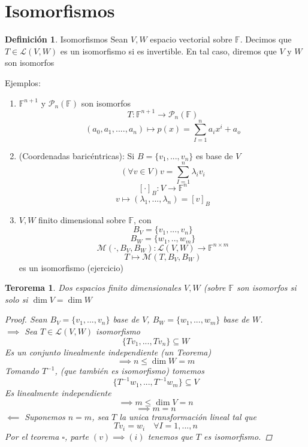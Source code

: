 \documentclass[11pt]{book}
\newtheorem{thm}{Terorema}[section]
\theoremstyle{definition}
\newtheorem{defn}{Definición}[section]
\begin{document}
\section{Isomorfismos}
\begin{defn}{Isomorfismos}
Sean $V,W$ espacio vectorial sobre $\mathbb{F}$. Decimos que $T\in\mathcal{L}(V,W)$ es un isomorfismo si es invertible. En tal caso, diremos que $V$ y $W$ son isomorfos
\end{defn}
Ejemplos:
\begin{enumerate}
	\item $\mathbb{F}^{n+1}$ y $\mathcal{P}_n(\mathbb{F})$ son isomorfos
	\[T:\mathbb{F}^{n+1}\rightarrow \mathcal{P}_n(\mathbb{F})\]
	\[(a_0,a_1,....,a_n)\mapsto p(x)=\sum^n_{I=1}a_ix^i+a_o\]
	
	\item (Coordenadas baricéntricas): Si $B=\{v_1,...,v_n\}$ es base de $V$
	\[(\forall v\in V)v=\sum^n_{I=1}\lambda_i v_i\]
	\[ [\cdot ]_B:V\rightarrow \mathbb{F}^n\]
	\[ v\mapsto(\lambda_1,...,\lambda_n)=[v]_B\]
	
	\item $V,W$ finito dimensional sobre $\mathbb{F}$, con
	\[B_V=\{v_1,...,v_n\}\]
	\[B_W=\{w_1,..,w_m\}\]
	\[\mathcal{M}(\cdot,B_V,B_W):\mathcal{L}(V,W)\rightarrow \mathbb{F}^{n\times m}\]
	\[T\mapsto\mathcal{M}(T,B_V,B_W)\]
	es un isomorfismo (ejercicio)
\end{enumerate}
\begin{thm}
Dos espacios finito dimensionales $V,W$ (sobre $\mathbb{F}$ son isomorfos si solo si $\dim V= \dim W$
\begin{proof}
Sean $B_V=\{v_1,...,v_n\}$ base de $V$, $B_W=\{w_1,...,w_m\}$ base de $W$.\\
$\implies$ Sea $T\in\mathcal{L}(V,W)$ isomorfismo
\[\{Tv_1,...,Tv_n\}\subseteq W\]
Es un conjunto linealmente independiente (un Teorema)
\[\implies n\leq \dim W=m\]
Tomando $T^{-1}$, (que también es isomorfismo) tomemos
\[\{T^{-1}w_1,...,T^{-1}w_m\}\subseteq V\]
Es linealmente independiente
\[\implies m\leq\dim V=n\]
\[\implies m=n\]
$\impliedby$ Suponemos $n=m$, sea $T$ la unica transformación lineal tal que
\[Tv_i=w_i\quad\forall I=1,...,n\]
Por el teorema $\square$, parte $(v)\implies (i)$ tenemos que $T$ es isomorfismo.
\end{proof}
\end{thm}
\end{document}
